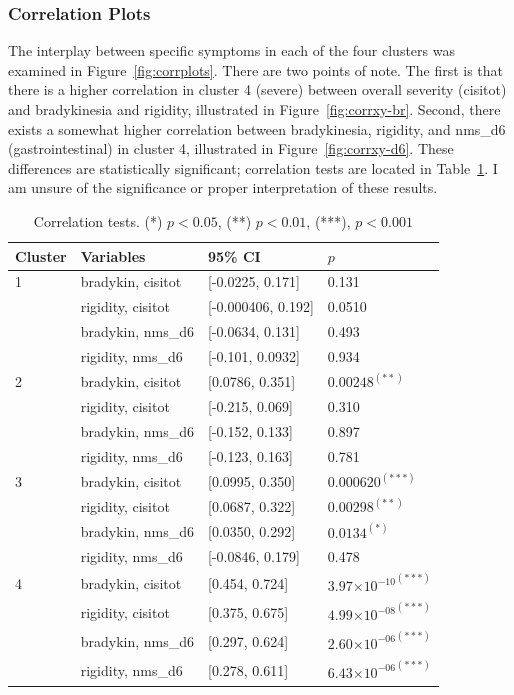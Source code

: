 \documentclass[10pt]{article}
\providecommand{\e}[1]{\ensuremath{\times 10^{#1}}}
\begin{document}
\begin{multicols}{2}
\subsubsection{Correlation Plots}

The interplay between specific symptoms in each of the four clusters was
examined in Figure~\ref{fig:corrplots}. There are two points of note. The first
is that there is a higher correlation in cluster 4 (severe) between overall
severity (cisitot) and bradykinesia and rigidity, illustrated in
Figure~\ref{fig:corrxy-br}.
Second, there exists a somewhat higher correlation between
bradykinesia, rigidity, and nms\_d6 (gastrointestinal) in cluster 4,
illustrated in Figure~\ref{fig:corrxy-d6}. These differences are statistically
significant; correlation tests are located in Table~\ref{tab:cortests}. I am
unsure of the significance or proper interpretation of these results.

\begin{table}[t]
  \centering
  \begin{tabular}{l|l|l|l}
 Cluster & Variables & 95\% CI & $p$ \\
    \hline
1 & bradykin, cisitot&[-0.0225, 0.171]&0.131 \\
  & rigidity, cisitot&[-0.000406, 0.192]&0.0510 \\
  & bradykin, nms\_d6&[-0.0634, 0.131]&0.493 \\
  & rigidity, nms\_d6&[-0.101, 0.0932]&0.934 \\
  \hline
2 & bradykin, cisitot&[0.0786, 0.351]&$0.00248^{(**)}$ \\
  & rigidity, cisitot&[-0.215, 0.069]&0.310 \\
  & bradykin, nms\_d6&[-0.152, 0.133]&0.897 \\
  & rigidity, nms\_d6&[-0.123, 0.163]&0.781 \\
  \hline
3 & bradykin, cisitot&[0.0995, 0.350]&$0.000620^{(***)}$ \\
  & rigidity, cisitot&[0.0687, 0.322]&$0.00298^{(**)}$ \\
  & bradykin, nms\_d6&[0.0350, 0.292]&$0.0134^{(*)}$ \\
  & rigidity, nms\_d6&[-0.0846, 0.179]&0.478 \\
  \hline
  4 & bradykin, cisitot&[0.454, 0.724]&${3.97\e{-10}}^{(***)}$ \\
& rigidity, cisitot&[0.375, 0.675]&${4.99\e{-08}}^{(***)}$ \\
  & bradykin, nms\_d6&[0.297, 0.624]&${2.60\e{-06}}^{(***)}$ \\
  & rigidity, nms\_d6&[0.278, 0.611]&${6.43\e{-06}}^{(***)}$ \\
  \end{tabular}
  \caption{Correlation tests. (*) $p < 0.05$, (**) $p < 0.01$, (***), $p < 0.001$}
  \label{tab:cortests}
\end{table}


\end{multicols}
\end{document}
